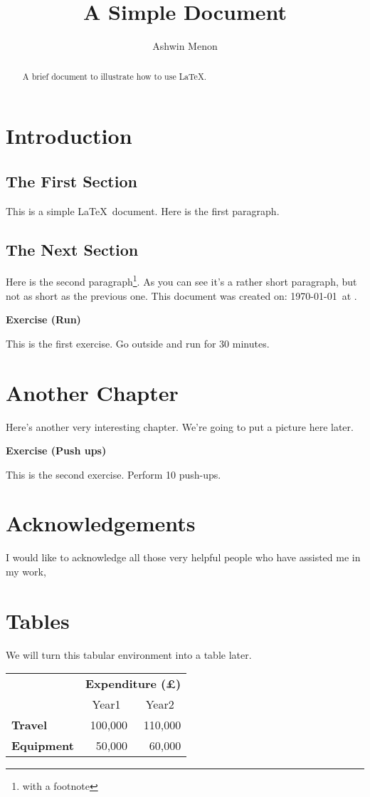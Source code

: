 \documentclass[12pt]{scrreprt}
\title{A Simple Document}
\author{Ashwin Menon}
\newenvironment{exercise}[1]
{
    \par\vspace{\baselineskip}\noindent
    \textbf{Exercise (#1)}\begin{itshape}
    \par\vspace{\baselineskip}\noindent\ignorespaces
}
{
    \end{itshape}\ignorespacesafterend
}
\begin{document}
\maketitle

\begin{abstract}
A brief document to illustrate how to use \LaTeX.    
\end{abstract}

\chapter{Introduction}

\section{The First Section}
This is a simple \LaTeX\ document. 
Here is the first paragraph.

\section{The Next Section}
Here is the second paragraph\footnote{with a footnote}. As you
can see it's a rather short paragraph, but not as short as the
previous one. This document was created on: \today\ at \currenttime.

\begin{exercise}{Run}
This is the first exercise. Go outside and run for 30 minutes.
\end{exercise}

\chapter{Another Chapter}

Here's another very interesting chapter.
We're going to put a picture here later.

\begin{exercise}{Push ups}
This is the second exercise. Perform 10 push-ups.
\end{exercise}

\chapter*{Acknowledgements}

I would like to acknowledge all those
very helpful people who have assisted me in my work,

\appendix

\chapter{Tables}
We will turn this tabular environment into a table later.

\begin{tabular}{lrr}
                     & \multicolumn{2}{c}{\bfseries Expenditure (\pounds)} \\
                     & \multicolumn{1}{c}{Year1} & \multicolumn{1}{c}{Year2} \\
 \bfseries Travel    & 100,000 & 110,000 \\
 \bfseries Equipment & 50,000  & 60,000
\end{tabular}
\end{document}
